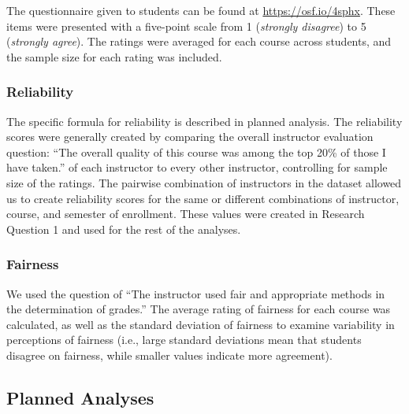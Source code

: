 \documentclass[
  man]{apa7}
\begin{document}
The questionnaire given to students can be found at
\url{https://osf.io/4sphx}. These items were presented with a five-point
scale from 1 (\emph{strongly disagree}) to 5 (\emph{strongly agree}). The ratings were averaged for each course across students, and the sample size for each rating was included.

\hypertarget{reliability-1}{%
\subsubsection{Reliability}\label{reliability-1}}

The specific formula for reliability is described in planned analysis. The reliability scores were generally created by comparing the overall instructor evaluation question: ``The overall quality of this course was among the top 20\% of those I have taken.'' of each instructor to every other instructor, controlling for sample size of the ratings. The pairwise combination of instructors in the dataset allowed us to create reliability scores for the same or different combinations of instructor, course, and semester of enrollment. These values were created in Research Question 1 and used for the rest of the analyses.

\hypertarget{fairness}{%
\subsubsection{Fairness}\label{fairness}}

We used the question of ``The instructor used fair and appropriate methods in the determination of grades.'' The average rating of fairness for each course was calculated, as well as the standard deviation of fairness to examine variability in perceptions of fairness (i.e., large standard deviations mean that students disagree on fairness, while smaller values indicate more agreement).

\hypertarget{planned-analyses}{%
\subsection{Planned Analyses}\label{planned-analyses}}
\end{document}
